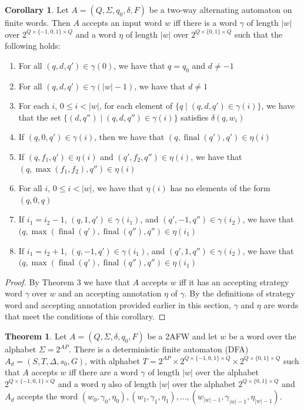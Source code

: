 \documentclass[10pt,a4paper]{amsart}
\theoremstyle{plain}
\theoremstyle{definition}
\newtheorem{theorem}[thm]{Theorem}
\newtheorem{corollary}[thm]{Corollary}
\theoremstyle{definition}
\DeclareMathOperator{\?}{?}
\DeclareMathOperator{\final}{final}
\begin{document}
\begin{corollary}
Let $A = (Q, \Sigma, q_0, \delta, F)$ be a two-way alternating automaton on finite words. Then $A$ accepts an input word $w$ iff there is a word $\gamma$ of length $|w|$ over $2^{Q \times \{-1,0,1\} \times Q}$ and a word $\eta$ of length $|w|$ over $2^{Q \times \{0,1\} \times Q}$ such that the following holds:

\begin{enumerate}
    \item For all $(q,d,q') \in \gamma(0)$, we have that $q = q_0$ and $d \neq -1$
    \item For all $(q,d,q') \in \gamma(|w|-1)$, we have that $d \neq 1$
    \item For each $i$, $0 \leq i < |w|$, for each element of $\{q \mid (q,d,q') \in \gamma(i)\}$, we have that the set $\{(d,q'') \mid (q,d,q'') \in \gamma(i)\}$ satisfies $\delta(q,w_i)$
    \item If $(q,0,q') \in \gamma(i)$, then we have that $(q,\final(q'),q') \in \eta(i)$
       \item If $(q,f_1,q') \in \eta(i)$ and $(q',f_2,q'') \in \eta(i)$, we have that $(q,\max(f_1,f_2),q'') \in \eta(i)$
    \item For all $i$, $0 \leq i < |w|$, we have that $\eta(i)$ has no elements of the form $(q,0,q)$

    \item If $i_1 = i_2-1$, $(q,1,q') \in \gamma(i_1)$, and $(q',-1,q'') \in \gamma(i_2)$, we have that $(q,\max(\final(q'),\allowbreak \final(q''),q'') \in \eta(i_1)$
    \item If $i_1 = i_2+1$, $(q,-1,q') \in \gamma(i_1)$, and $(q',1,q'') \in \gamma(i_2)$, we have that $(q,\max(\final(q'),\allowbreak \final(q''),q'') \in \eta(i_1)$




\end{enumerate}

\end{corollary}
\begin{proof}
By Theorem 3 we have that $A$ accepts $w$ iff it has an accepting strategy word $\gamma$ over $w$ and an accepting annotation $\eta$ of $\gamma$. By the definitions of strategy word and accepting annotation provided earlier in this section, $\gamma$ and $\eta$ are words that meet the conditions of this corollary.
\end{proof}

\begin{theorem}
  Let $A = (Q,\Sigma,\delta,q_0,F)$ be a 2AFW and let $w$ be a word over the alphabet $\Sigma=2^{AP}$. There is a deterministic finite automaton (DFA) $A_d = (S,T,\Delta,s_0,G)$, with alphabet $T = 2^{AP} \times 2^{Q \times \{-1,0,1\} \times Q} \times 2^{Q \times \{0,1\} \times Q}$ such that $A$ accepts $w$ iff there are a word $\gamma$ of length $|w|$ over the alphabet $2^{Q \times \{-1,0,1\}\times Q}$ and a word $\eta$ also of length $|w|$ over the alphabet $2^{Q \times \{0,1\}\times Q}$ and $A_d$ accepts the word $(w_0, \gamma_0, \eta_0), (w_1, \gamma_1, \eta_1), \ldots, (w_{|w|-1}, \gamma_{|w|-1}, \eta_{|w|-1})$.

\end{theorem}
\end{document}
